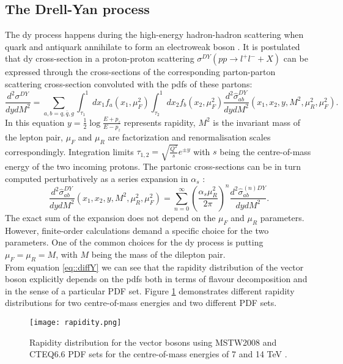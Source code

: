  		\subsection{The Drell-Yan process}
		The \gls{dy} process happens during the high-energy hadron-hadron scattering when quark and antiquark annihilate to form an electroweak boson \cite{drellyan}. It is postulated that \gls{dy} cross-section in a proton-proton scattering $\sigma^{DY} (pp \rightarrow l^{+}l^{-} + X)$ can be expressed through the cross-sections of the corresponding parton-parton scattering cross-section convoluted with the \gls{pdf}s of these partons:
		\begin{equation}
		\frac{d^2\sigma^{DY}}{dydM^2}=\sum_{a,b=q,\bar q,g}\int_{\tau_1}^1 dx_1 f_a(x_1,\mu_F^2) \int_{\tau_2}^1 dx_2 f_b(x_2,\mu_F^2)\frac{d^2\hat{\sigma}_{ab}^{DY}}{dydM^2}(x_1,x_2,y,M^2,\mu_R^2,\mu_F^2).
		\label{eq::diffY}
		\end{equation}
		In this equation $y=\frac{1}{2}\log{\frac{E+p_z}{E-p_z}}$ represents rapidity, $M^2$ is the invariant mass of the lepton pair, $\mu_F$ and $\mu_R$ are factorization and renormalisation scales correspondingly. Integration limits $\tau_{1,2}=\sqrt{\frac{Q^2}{s}}e^{\pm y}$ with $s$ being the centre-of-mass energy of the two incoming protons. The partonic cross-sections can be in turn computed perturbatively as a series expansion in $\alpha_s$ \cite{proton_struct}:
		\begin{equation}
		\frac{d^2\hat{\sigma}_{ab}^{DY}}{dydM^2}(x_1,x_2,y,M^2,\mu_R^2,\mu_F^2)=\sum_{n=0}^{\infty}\left(\frac{\alpha_s\mu^2_R}{2\pi}\right)^n\frac{d^2\hat{\sigma}_{ab}^{(n)DY}}{dydM^2}.
		\end{equation}
		The exact sum of the expansion does not depend on the $\mu_F$ and $\mu_R$ parameters. However, finite-order calculations demand a specific choice for the two parameters. One of the common choices for the \gls{dy} process is putting  $\mu_F=\mu_R=M$, with $M$ being the mass of the dilepton pair. \\
		From equation \ref{eq::diffY} we can see that the rapidity distribution of the vector boson explicitly depends on the \gls{pdf}s both in terms of flavour decomposition and in the sense of a particular PDF set. Figure \ref{fig::Wrapidity} demonstrates different rapidity distributions for two centre-of-mass energies and two different PDF sets.\\
		\begin{figure}[htbp]
			\centering
			\texttt{[image: rapidity.png]}
			\caption{ Rapidity distribution for the vector bosons using MSTW2008 and CTEQ6.6 PDF sets for the centre-of-mass energies of 7 and 14 TeV \cite{Halzen:2013bqa}.}
			\label{fig::Wrapidity}
		\end{figure}
